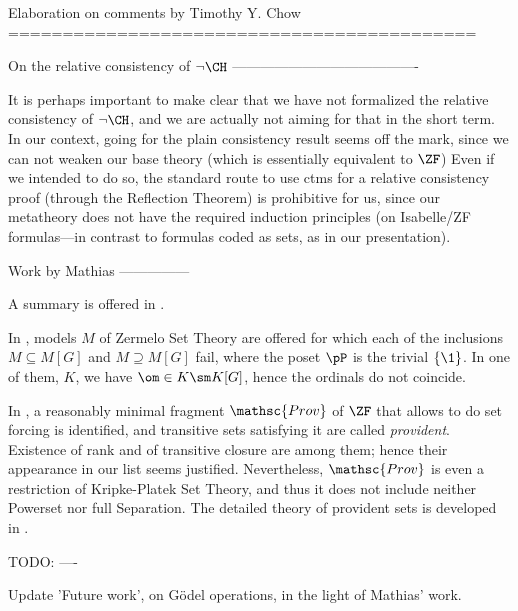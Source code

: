 Elaboration on comments by Timothy Y. Chow
===========================================

On the relative consistency of $\neg\CH$
----------------------------------------

It is perhaps important to make clear that we have not formalized the
relative consistency of $\neg\CH$, and we are
actually not aiming for that in the short term. In our context, going
for the plain consistency result seems off the mark, since we
can not weaken our base theory (which is essentially equivalent to $\ZF$)%
Even if we intended to do so, the standard route to use ctms for a
relative consistency proof (through the Reflection Theorem) is
prohibitive for us, since our metatheory does not have the required
induction principles (on Isabelle/ZF formulas---in contrast to
formulas coded as sets, as in our presentation).


Work by Mathias
---------------

A summary is offered in \cite[Sect.~6]{kanamori-mathias}.


In \cite[Sect.~1]{mathias:hal-01188043}, models $M$ of Zermelo Set
Theory are offered for which each of the inclusions $M\subseteq M[G]$ and
$M\supseteq M[G]$ fail, where the poset $\pP$ is the trivial
$\{\1 \}$. In one of them, $K$, we have $\om\in K \sm K[G]$, hence the
ordinals do not coincide.


In \cite{mathias-provident}, a reasonably minimal fragment
$\mathsc{Prov}$ of $\ZF$ that allows to do set forcing is identified,
and transitive sets satisfying it are called
\emph{provident}. Existence of rank and of transitive closure are
among them; hence their appearance in our list seems
justified. Nevertheless, $\mathsc{Prov}$ is even a restriction of
Kripke-Platek Set Theory, and thus it does not include neither
Powerset nor full Separation. The detailed theory of provident sets is
developed in \cite{mathias-bowler-gentle}. %


TODO:
----

Update 'Future work', on Gödel operations, in the light of Mathias'
work.
